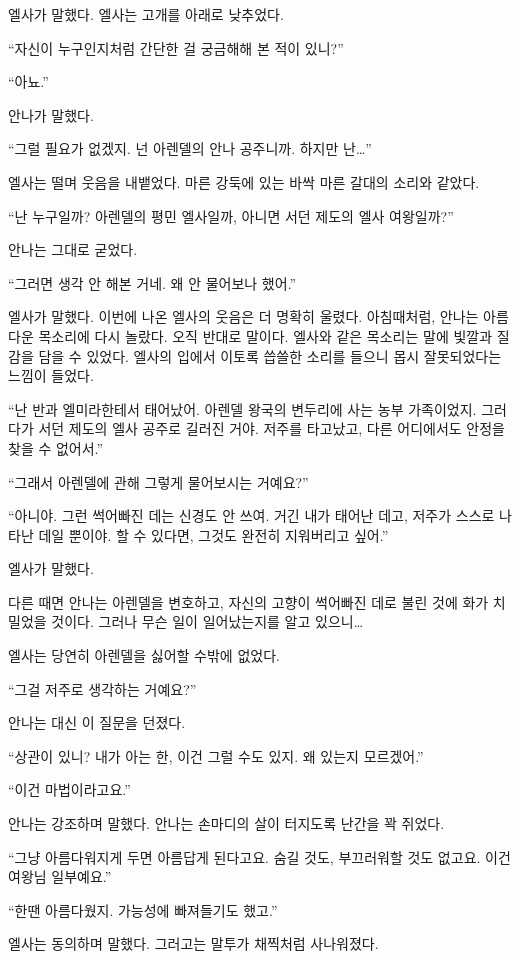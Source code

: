엘사가 말했다. 엘사는 고개를 아래로 낮추었다.

``자신이 누구인지처럼 간단한 걸 궁금해해 본 적이 있니?''

``아뇨.''

안나가 말했다.

``그럴 필요가 없겠지. 넌 아렌델의 안나 공주니까. 하지만 난\ldots''

엘사는 떨며 웃음을 내뱉었다. 마른 강둑에 있는 바싹 마른 갈대의 소리와 같았다.

``난 누구일까? 아렌델의 평민 엘사일까, 아니면 서던 제도의 엘사 여왕일까?''

안나는 그대로 굳었다.

``그러면 생각 안 해본 거네. 왜 안 물어보나 했어.''

엘사가 말했다. 이번에 나온 엘사의 웃음은 더 명확히 울렸다. 아침때처럼, 안나는 아름다운 목소리에 다시 놀랐다. 오직 반대로 말이다. 엘사와 같은 목소리는 말에 빛깔과 질감을 담을 수 있었다. 엘사의 입에서 이토록 씁쓸한 소리를 들으니 몹시 잘못되었다는 느낌이 들었다.

``난 반과 엘미라한테서 태어났어. 아렌델 왕국의 변두리에 사는 농부 가족이었지. 그러다가 서던 제도의 엘사 공주로 길러진 거야. 저주를 타고났고, 다른 어디에서도 안정을 찾을 수 없어서.''

``그래서 아렌델에 관해 그렇게 물어보시는 거예요?''

``아니야. 그런 썩어빠진 데는 신경도 안 쓰여. 거긴 내가 태어난 데고, 저주가 스스로 나타난 데일 뿐이야. 할 수 있다면, 그것도 완전히 지워버리고 싶어.''

엘사가 말했다.

다른 때면 안나는 아렌델을 변호하고, 자신의 고향이 썩어빠진 데로 불린 것에 화가 치밀었을 것이다. 그러나 무슨 일이 일어났는지를 알고 있으니\ldots

엘사는 당연히 아렌델을 싫어할 수밖에 없었다.

``그걸 저주로 생각하는 거예요?''

안나는 대신 이 질문을 던졌다.

``상관이 있니? 내가 아는 한, 이건 그럴 수도 있지. 왜 있는지 모르겠어.''

``이건 마법이라고요.''

안나는 강조하며 말했다. 안나는 손마디의 살이 터지도록 난간을 꽉 쥐었다.

``그냥 아름다워지게 두면 아름답게 된다고요. 숨길 것도, 부끄러워할 것도 없고요. 이건 여왕님 일부예요.''

``한땐 아름다웠지. 가능성에 빠져들기도 했고.''

엘사는 동의하며 말했다. 그러고는 말투가 채찍처럼 사나워졌다.

